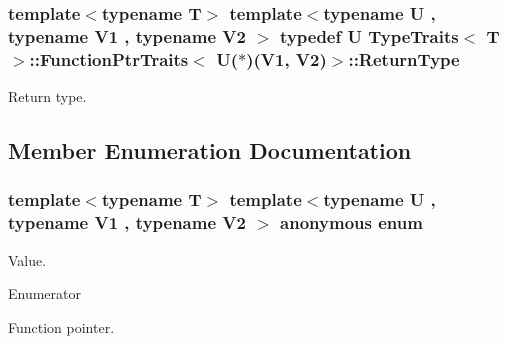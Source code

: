 \subsubsection[{\texorpdfstring{Return\+Type}{ReturnType}}]{\setlength{\rightskip}{0pt plus 5cm}template$<$typename T$>$ template$<$typename U , typename V1 , typename V2 $>$ typedef U {\bf Type\+Traits}$<$ T $>$\+::{\bf Function\+Ptr\+Traits}$<$ U($\ast$)(V1, V2)$>$\+::{\bf Return\+Type}}\hypertarget{structTypeTraits_1_1FunctionPtrTraits_3_01U_07_5_08_07V1_00_01V2_08_4_a48f1a676f3f7cb5f5e4c2d2a5050784e}{}\label{structTypeTraits_1_1FunctionPtrTraits_3_01U_07_5_08_07V1_00_01V2_08_4_a48f1a676f3f7cb5f5e4c2d2a5050784e}
Return type. 

\subsection{Member Enumeration Documentation}
\subsubsection[{\texorpdfstring{anonymous enum}{anonymous enum}}]{\setlength{\rightskip}{0pt plus 5cm}template$<$typename T$>$ template$<$typename U , typename V1 , typename V2 $>$ anonymous enum}\hypertarget{structTypeTraits_1_1FunctionPtrTraits_3_01U_07_5_08_07V1_00_01V2_08_4_a7174898c28b3492c5115774a13e19211}{}\label{structTypeTraits_1_1FunctionPtrTraits_3_01U_07_5_08_07V1_00_01V2_08_4_a7174898c28b3492c5115774a13e19211}
Value. \begin{Desc}
\item[Enumerator]\par
\begin{description}
\item[{\em 
Is\+Function\+Pointer\hypertarget{structTypeTraits_1_1FunctionPtrTraits_3_01U_07_5_08_07V1_00_01V2_08_4_a7174898c28b3492c5115774a13e19211a044f925811737913e50ed579c4ea0163}{}\label{structTypeTraits_1_1FunctionPtrTraits_3_01U_07_5_08_07V1_00_01V2_08_4_a7174898c28b3492c5115774a13e19211a044f925811737913e50ed579c4ea0163}
}]Function pointer. \end{description}
\end{Desc}

